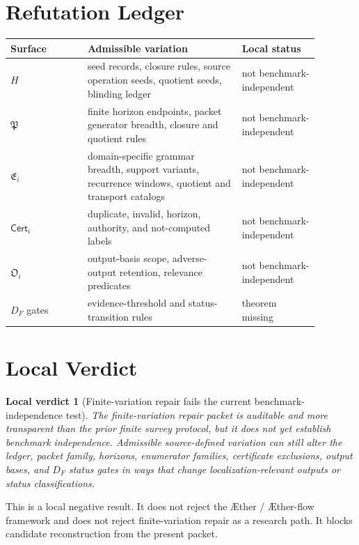 \documentclass[11pt]{article}
\newcommand{\Aether}{\AE{}ther}
\newcommand{\Aflow}{\AE{}ther-flow}
\newcommand{\TheoryProgram}{\Aether{} / \Aflow{} framework}
\newcommand{\PackFam}{\mathfrak{P}}
\newcommand{\EnumFam}{\mathfrak{E}}
\newcommand{\Cert}{\mathsf{Cert}}
\newcommand{\OutFam}{\mathfrak{O}}
\newtheorem{verdict}{Local verdict}
\begin{document}
\section{Refutation Ledger}

\begin{center}
\begin{tabular}{p{0.22\linewidth}p{0.44\linewidth}p{0.22\linewidth}}
\textbf{Surface} & \textbf{Admissible variation} & \textbf{Local status} \\
\hline
\(H\) & seed records, closure rules, source operation seeds, quotient seeds, blinding ledger & not benchmark-independent \\
\(\PackFam\) & finite horizon endpoints, packet generator breadth, closure and quotient rules & not benchmark-independent \\
\(\EnumFam_i\) & domain-specific grammar breadth, support variants, recurrence windows, quotient and transport catalogs & not benchmark-independent \\
\(\Cert_i\) & duplicate, invalid, horizon, authority, and not-computed labels & not benchmark-independent \\
\(\OutFam_i\) & output-basis scope, adverse-output retention, relevance predicates & not benchmark-independent \\
\(D_F\) gates & evidence-threshold and status-transition rules & theorem missing \\
\end{tabular}
\end{center}

\section{Local Verdict}

\begin{verdict}[Finite-variation repair fails the current benchmark-independence test]
The finite-variation repair packet is auditable and more transparent than
the prior finite survey protocol, but it does not yet establish benchmark
independence. Admissible source-defined variation can still alter the
ledger, packet family, horizons, enumerator families, certificate
exclusions, output bases, and \(D_F\) status gates in ways that change
localization-relevant outputs or status classifications.
\end{verdict}

This is a local negative result. It does not reject the \TheoryProgram{} and
does not reject finite-variation repair as a research path. It blocks
candidate reconstruction from the present packet.
\end{document}
